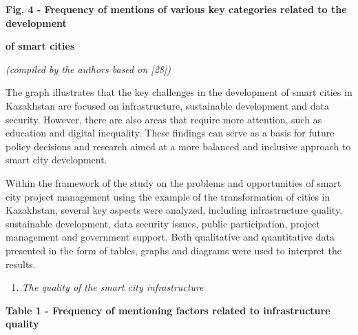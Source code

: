 {\bfseries Fig. 4 - Frequency of mentions of various key categories related
to the development}

{\bfseries of smart cities}

\emph{(compiled by the authors based on {[}28{]})}

The graph illustrates that the key challenges in the development of
smart cities in Kazakhstan are focused on infrastructure, sustainable
development and data security. However, there are also areas that
require more attention, such as education and digital inequality. These
findings can serve as a basis for future policy decisions and research
aimed at a more balanced and inclusive approach to smart city
development.

Within the framework of the study on the problems and opportunities of
smart city project management using the example of the transformation of
cities in Kazakhstan, several key aspects were analyzed, including
infrastructure quality, sustainable development, data security issues,
public participation, project management and government support. Both
qualitative and quantitative data presented in the form of tables,
graphs and diagrams were used to interpret the results.

\begin{enumerate}
\def\labelenumi{\arabic{enumi}.}
\item
  \emph{The quality of the smart city infrastructure}
\end{enumerate}

{\bfseries Table 1 - Frequency of mentioning factors related to
infrastructure quality}


